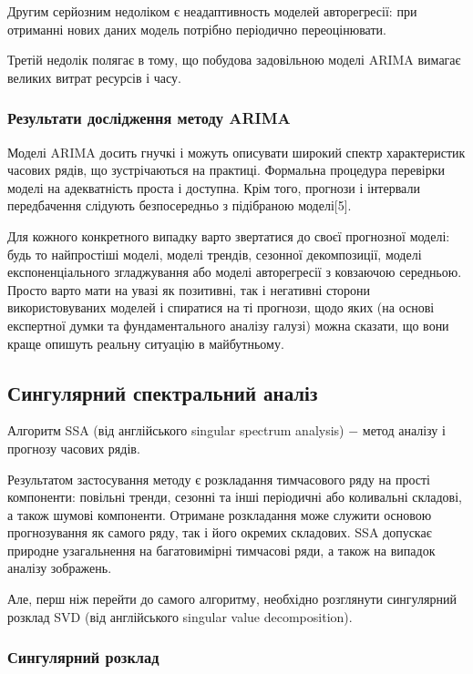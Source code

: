 Другим серйозним недоліком є неадаптивность моделей авторегресії: при отриманні нових даних модель потрібно періодично переоцінювати.

Третій недолік полягає в тому, що побудова задовільною моделі ARIMA вимагає великих витрат ресурсів і часу.

\subsubsection{Результати дослідження методу ARIMA}

Моделі ARIMA досить гнучкі і можуть описувати широкий спектр характеристик часових рядів, що зустрічаються на практиці. Формальна процедура перевірки моделі на адекватність проста і доступна. Крім того, прогнози і інтервали передбачення слідують безпосередньо з підібраною моделі[5].

Для кожного конкретного випадку варто звертатися до своєї прогнозної моделі: будь то найпростіші моделі, моделі трендів, сезонної декомпозиції, моделі експоненціального згладжування або моделі авторегресії з ковзаючою середньою. Просто варто мати на увазі як позитивні, так і негативні сторони використовуваних моделей і спиратися на ті прогнози, щодо яких (на основі експертної думки та фундаментального аналізу галузі) можна сказати, що вони краще опишуть реальну ситуацію в майбутньому.

\subsection{Сингулярний спектральний аналіз}

Алгоритм SSA (від англійського singular spectrum analysis) $-$ метод аналізу і прогнозу часових рядів. 

Результатом застосування методу є розкладання тимчасового ряду на прості компоненти: повільні тренди, сезонні та інші періодичні або коливальні складові, а також шумові компоненти. Отримане розкладання може служити основою прогнозування як самого ряду, так і його окремих складових. SSA допускає природне узагальнення на багатовимірні тимчасові ряди, а також на випадок аналізу зображень.

Але, перш ніж перейти до самого алгоритму, необхідно розглянути сингулярний розклад SVD (від англійського singular value decomposition).

\subsubsection{Сингулярний розклад}

